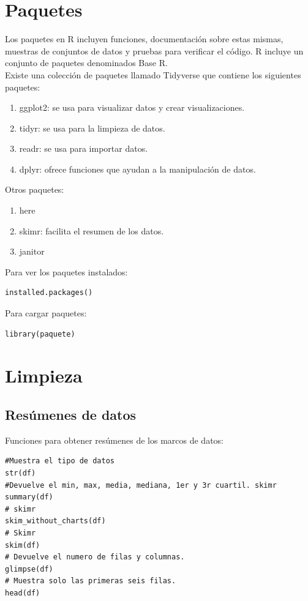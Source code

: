 \documentclass[a4paper, 12pt]{book}
\begin{document}
\section{Paquetes}
Los paquetes en R incluyen funciones, documentación sobre estas mismas, muestras de conjuntos de datos y pruebas para verificar el código. R incluye un conjunto de paquetes denominados Base R. \\
Existe una colección de paquetes llamado Tidyverse que contiene los siguientes paquetes:
\begin{enumerate}
\item ggplot2: se usa para visualizar datos y crear visualizaciones.
\item tidyr: se usa para la limpieza de datos.
\item readr: se usa para importar datos.
\item dplyr: ofrece funciones que ayudan a la manipulación de datos.
\end{enumerate}


Otros paquetes:
\begin{enumerate}
\item here
\item skimr: facilita el resumen de los datos.
\item janitor
\end{enumerate}

Para ver los paquetes instalados:
\begin{verbatim}
installed.packages()
\end{verbatim}


Para cargar paquetes:
\begin{verbatim}
library(paquete)
\end{verbatim}
\section{Limpieza}
\subsection{Resúmenes de datos}
Funciones para obtener resúmenes de los marcos de datos:
\begin{verbatim}
#Muestra el tipo de datos
str(df)
#Devuelve el min, max, media, mediana, 1er y 3r cuartil. skimr
summary(df)
# skimr
skim_without_charts(df)
# Skimr
skim(df)
# Devuelve el numero de filas y columnas.
glimpse(df)
# Muestra solo las primeras seis filas.
head(df)
\end{verbatim}
\end{document}
